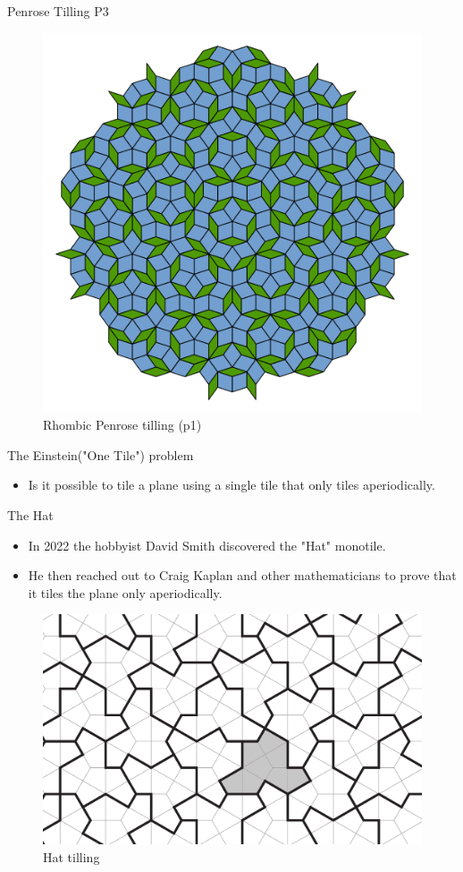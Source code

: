 \documentclass{beamer}
\begin{document}
\begin{frame}{Penrose Tilling P3}
    \begin{figure}
        \centering
        \includegraphics[width=0.6\linewidth]{images/penrose/Penrose_Tiling_(Rhombi).svg}
        \caption{Rhombic Penrose tilling (p1)\cite{penrose_tiling_rhombi}}
        \label{fig:penrose-rhombi}
    \end{figure}
\end{frame}

\begin{frame}{The Einstein("One Tile") problem}
    \begin{itemize}
        \item Is it possible to tile a plane using a single tile that only tiles aperiodically.
    \end{itemize}
\end{frame}

\begin{frame}{The Hat}
    \begin{itemize}
        \item In 2022 the hobbyist David Smith discovered the "Hat" monotile.
        \item He then reached out to Craig Kaplan and other mathematicians to prove that it tiles the plane only aperiodically\cite{Smith_2024}.
    \end{itemize}
    
    \begin{figure}
        \centering
        \includegraphics[width=0.5\linewidth]{images/aperiodic-pdfs/polykite_tiling_raster.pdf}
        \caption{Hat tilling}
        \label{fig:hat-monotile}
    \end{figure}
\end{frame}
\end{document}
